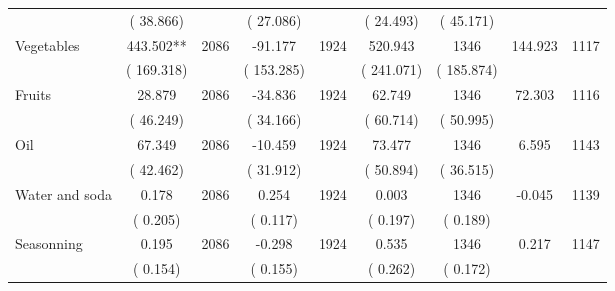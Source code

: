 \begin{tabular}{l*{8}{c}}
                       &       (      38.866)            &                               &       (      27.086)            &                               &       (      24.493)            &       (      45.171) &                  \\
Vegetables        &            443.502**      &       2086       &            -91.177      &       1924       &            520.943      &       1346  &      144.923 &       1117       \\
                       &       (     169.318)            &                               &       (     153.285)            &                               &       (     241.071)            &       (     185.874) &                  \\
Fruits        &             28.879      &       2086       &            -34.836      &       1924       &             62.749      &       1346  &       72.303 &       1116       \\
                       &       (      46.249)            &                               &       (      34.166)            &                               &       (      60.714)            &       (      50.995) &                  \\
Oil        &             67.349      &       2086       &            -10.459      &       1924       &             73.477      &       1346  &        6.595 &       1143       \\
                       &       (      42.462)            &                               &       (      31.912)            &                               &       (      50.894)            &       (      36.515) &                  \\
Water and soda        &              0.178      &       2086       &              0.254      &       1924       &              0.003      &       1346  &       -0.045 &       1139       \\
                       &       (       0.205)            &                               &       (       0.117)            &                               &       (       0.197)            &       (       0.189) &                  \\
Seasonning        &              0.195      &       2086       &             -0.298      &       1924       &              0.535      &       1346  &        0.217 &       1147       \\
                       &       (       0.154)            &                               &       (       0.155)            &                               &       (       0.262)            &       (       0.172) &                  \\

\end{tabular}
